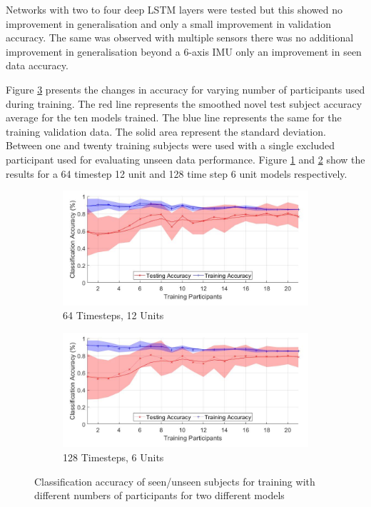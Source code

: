 \documentclass[sensors,article,submit,moreauthors,pdftex]{Definitions/mdpi}
\begin{document}
Networks with two to four deep LSTM layers were tested but this showed no improvement in generalisation and only a small improvement in validation accuracy. The same was observed with multiple sensors there was no additional improvement in generalisation beyond a 6-axis IMU only an improvement in seen data accuracy.

Figure \ref{fig:subject_num_generalisation} presents the changes in accuracy for varying number of participants used during training. The red line represents the smoothed novel test subject accuracy average for the ten models trained. The blue line represents the same for the training validation data. The solid area represent the standard deviation. Between one and twenty training subjects were used with a single excluded participant used for evaluating unseen data performance. Figure \ref{fig:subject_num_generalisation_64x12} and \ref{fig:subject_num_generalisation_128x6} show the results for a 64 timestep 12 unit and 128 time step 6 unit models respectively.

\begin{figure}[!htb]
    \centering
    \begin{subfigure}[b]{0.49\textwidth}
         \centering
        \includegraphics[width=\textwidth]{Figures/results/number_participants_64x12.jpg}
        \caption{64 Timesteps, 12 Units}
        \label{fig:subject_num_generalisation_64x12}
    \end{subfigure}
    \hfil
    \begin{subfigure}[b]{0.49\textwidth}
         \centering
        \includegraphics[width=\textwidth]{Figures/results/number_participants_128x6.jpg}
        \caption{128 Timesteps, 6 Units}
        \label{fig:subject_num_generalisation_128x6}
    \end{subfigure}
    \caption{Classification accuracy of seen/unseen subjects for training with different numbers of participants for two different models}
    \label{fig:subject_num_generalisation}
\end{figure}
\end{document}

